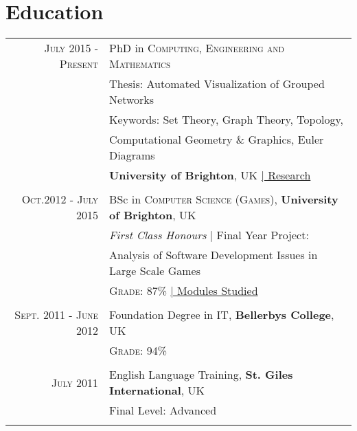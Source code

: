 \documentclass[a4paper,10pt]{article} %
\begin{document}

\section{Education}

\begin{tabular}{r|p{11cm}}
\textsc{July 2015 - Present} & PhD in \textsc{Computing, Engineering and Mathematics}\\
& Thesis: Automated Visualization of Grouped Networks\\
& Keywords: Set Theory, Graph Theory, Topology,\\
& Computational Geometry \& Graphics, Euler Diagrams \\
& \textbf{University of Brighton}, UK \hyperlink{papers}{\hfill | \footnotesize Research}\\
\multicolumn{2}{c}{} \\

	
\textsc{Oct.2012 - July 2015} & BSc in \textsc{Computer Science (Games)}, \textbf{University of Brighton}, UK\\
& \small\emph{First Class Honours} | Final Year Project: \\
& Analysis of Software Development Issues in Large Scale Games\\
&\normalsize \textsc{Grade}: 87\% \hyperlink{grds}{\hfill | \footnotesize Modules Studied}\\
\multicolumn{2}{c}{} \\


\textsc{Sept. 2011 - June 2012} & Foundation Degree in \textsc{IT}, \normalsize\textbf{Bellerbys College}, UK\\
&\normalsize \textsc{Grade}: 94\% \\
\multicolumn{2}{c}{} \\


\textsc{July 2011} & English Language Training, \textbf{St. Giles International}, UK \\
& Final Level: Advanced\\
\multicolumn{2}{c}{} \\

\end{tabular}
\vspace{1cm}
\end{document}

